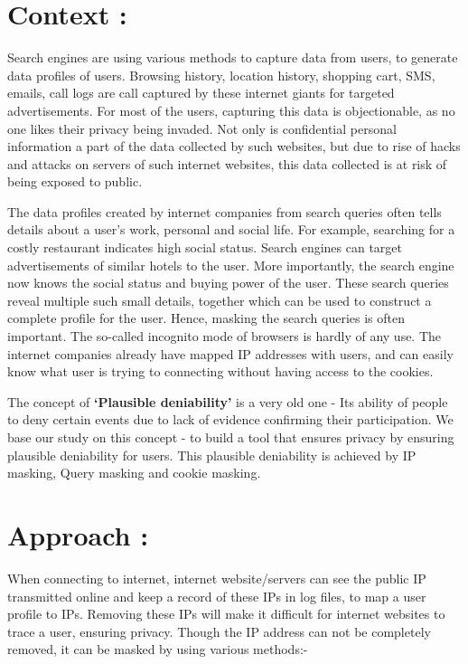 \documentclass[11pt]{article}
\begin{document}
\section {Context :}
Search engines are using various methods to capture data from users, to generate data profiles of users. Browsing history, location history, shopping cart, SMS, emails, call logs are call captured by these internet giants for targeted advertisements. For most of the users, capturing this data is objectionable, as no one likes their privacy being invaded. Not only is confidential personal information a part of the data collected by such websites, but due to rise of hacks and attacks on servers of such internet websites, this data collected is at risk of being exposed to public. \newline

The data profiles created by internet companies from search queries often tells details about a user’s work, personal and social life. For example, searching for a costly restaurant indicates high social status. Search engines can target advertisements of similar hotels to the user. More importantly, the search engine now knows the social status and buying power of the user. These search queries reveal multiple such small details, together which can be used to construct a complete profile for the user. Hence, masking the search queries is often important. The so-called incognito mode of browsers is hardly of any use. The internet companies already have mapped IP addresses with users, and can easily know what user is trying to connecting without having access to the cookies.\newline 

The concept of \textbf{‘Plausible deniability’} is a very old one - Its ability of people to deny certain events due to lack of evidence confirming their participation. We base our study on this concept - to build a tool that ensures privacy by ensuring plausible deniability for users. This plausible deniability is achieved by IP masking, Query masking and cookie masking.

\section{Approach :}
When connecting to internet, internet website/servers can see the public IP transmitted online and keep a record of these IPs in log files, to map a user profile to IPs. Removing these IPs will make it difficult for internet websites to trace a user, ensuring privacy. Though the IP address can not be completely removed, it can be masked by using various methods:-\newline
\end{document}
